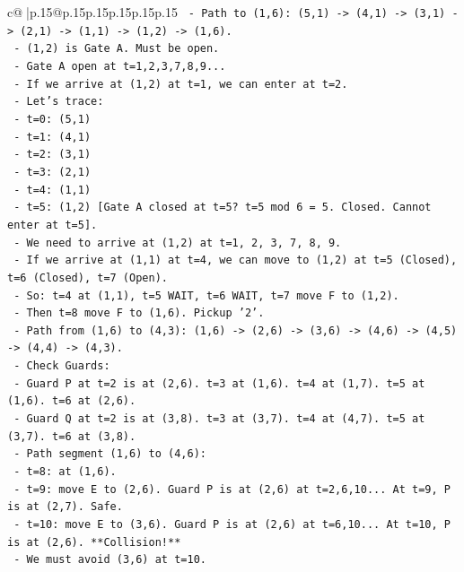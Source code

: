 \documentclass{article}
\begin{document}
{\begin{supertabular}{c@{$\;$}|p{.15\linewidth}@{}p{.15\linewidth}p{.15\linewidth}p{.15\linewidth}p{.15\linewidth}p{.15\linewidth}}
{{{\texttt{    {-} Path to (1,6): (5,1) {-}> (4,1) {-}> (3,1) {-}> (2,1) {-}> (1,1) {-}> (1,2) {-}> (1,6).} \\
\texttt{      {-} (1,2) is Gate A. Must be open.} \\
\texttt{      {-} Gate A open at t=1,2,3,7,8,9...} \\
\texttt{      {-} If we arrive at (1,2) at t=1, we can enter at t=2.} \\
\texttt{      {-} Let's trace:} \\
\texttt{        {-} t=0: (5,1)} \\
\texttt{        {-} t=1: (4,1)} \\
\texttt{        {-} t=2: (3,1)} \\
\texttt{        {-} t=3: (2,1)} \\
\texttt{        {-} t=4: (1,1)} \\
\texttt{        {-} t=5: (1,2) {[}Gate A closed at t=5? t=5 mod 6 = 5. Closed. Cannot enter at t=5{]}.} \\
\texttt{        {-} We need to arrive at (1,2) at t=1, 2, 3, 7, 8, 9.} \\
\texttt{        {-} If we arrive at (1,1) at t=4, we can move to (1,2) at t=5 (Closed), t=6 (Closed), t=7 (Open).} \\
\texttt{        {-} So: t=4 at (1,1), t=5 WAIT, t=6 WAIT, t=7 move F to (1,2).} \\
\texttt{        {-} Then t=8 move F to (1,6). Pickup '2'.} \\
\texttt{    {-} Path from (1,6) to (4,3): (1,6) {-}> (2,6) {-}> (3,6) {-}> (4,6) {-}> (4,5) {-}> (4,4) {-}> (4,3).} \\
\texttt{      {-} Check Guards:} \\
\texttt{        {-} Guard P at t=2 is at (2,6). t=3 at (1,6). t=4 at (1,7). t=5 at (1,6). t=6 at (2,6).} \\
\texttt{        {-} Guard Q at t=2 is at (3,8). t=3 at (3,7). t=4 at (4,7). t=5 at (3,7). t=6 at (3,8).} \\
\texttt{      {-} Path segment (1,6) to (4,6):} \\
\texttt{        {-} t=8: at (1,6).} \\
\texttt{        {-} t=9: move E to (2,6). Guard P is at (2,6) at t=2,6,10... At t=9, P is at (2,7). Safe.} \\
\texttt{        {-} t=10: move E to (3,6). Guard P is at (2,6) at t=6,10... At t=10, P is at (2,6). **Collision!**} \\
\texttt{        {-} We must avoid (3,6) at t=10.} \\
}}}
\end{supertabular}}
\end{document}
